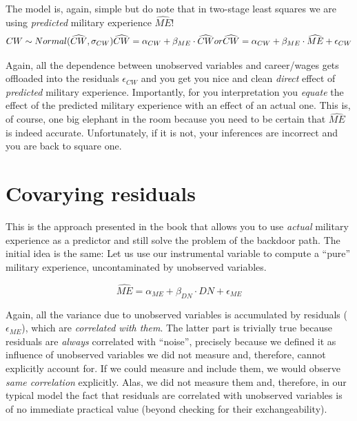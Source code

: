 \documentclass[
]{book}
\begin{document}
The model is, again, simple but do note that in two-stage least squares we are using \emph{predicted} military experience \(\widehat{ME}\)!
\[CW \sim Normal(\widehat{CW}, \sigma_{CW})\\
\widehat{CW} = \alpha_{CW} + \beta_{ME} \cdot \widehat{CW}\\
or\\
\widehat{CW} = \alpha_{CW} + \beta_{ME} \cdot \widehat{ME} + \epsilon_{CW}
\]

Again, all the dependence between unobserved variables and career/wages gets offloaded into the residuals \(\epsilon_{CW}\) and you get you nice and clean \emph{direct} effect of \emph{predicted} military experience. Importantly, for you interpretation you \emph{equate} the effect of the predicted military experience with an effect of an actual one. This is, of course, one big elephant in the room because you need to be certain that \(\widehat{ME}\) is indeed accurate. Unfortunately, if it is not, your inferences are incorrect and you are back to square one.

\hypertarget{covarying-residuals}{%
\section*{Covarying residuals}\label{covarying-residuals}}

This is the approach presented in the book that allows you to use \emph{actual} military experience as a predictor and still solve the problem of the backdoor path. The initial idea is the same: Let us use our instrumental variable to compute a ``pure'' military experience, uncontaminated by unobserved variables.

\[\widehat{ME} = \alpha_{ME} + \beta_{DN} \cdot DN + \epsilon_{ME}\]

Again, all the variance due to unobserved variables is accumulated by residuals (\(\epsilon_{ME}\)), which are \emph{correlated with them}. The latter part is trivially true because residuals are \emph{always} correlated with ``noise'', precisely because we defined it as influence of unobserved variables we did not measure and, therefore, cannot explicitly account for. If we could measure and include them, we would observe \emph{same correlation} explicitly. Alas, we did not measure them and, therefore, in our typical model the fact that residuals are correlated with unobserved variables is of no immediate practical value (beyond checking for their exchangeability).
\end{document}
